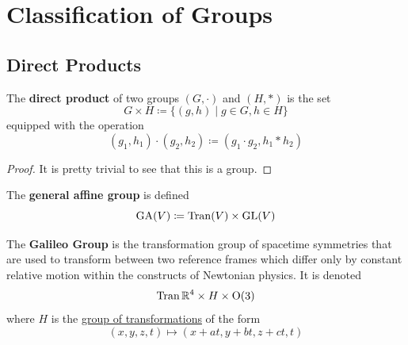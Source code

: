 \section{Classification of Groups} 

\subsection{Direct Products}

  \begin{definition}
    \label{def:direct-product}
    The \textbf{direct product} of two groups $(G, \cdot)$ and $(H, \ast)$ is the set 
    \begin{equation}
      G \times H \coloneqq \{ (g, h) \mid g \in G, h \in H \}
    \end{equation} 
    equipped with the operation 
    \begin{equation}
      (g_1, h_1) \cdot (g_2, h_2) \coloneqq (g_1 \cdot g_2, h_1 \ast h_2)
    \end{equation}
  \end{definition}
  \begin{proof}
    It is pretty trivial to see that this is a group. 
  \end{proof}

  \begin{example}
    \label{ex:general-affine-group}
    The \textbf{general affine group} is defined 
    \begin{equation}
      \operatorname{GA}(V) \coloneqq \operatorname{Tran}(V) \times \operatorname{GL}(V)
    \end{equation}
  \end{example}

  \begin{example}
    \label{ex:galileo-group}
    The \textbf{Galileo Group} is the transformation group of spacetime symmetries that are used to transform between two reference frames which differ only by constant relative motion within the constructs of Newtonian physics. It is denoted 
    \begin{equation}
      \operatorname{Tran} \mathbb{R}^{4} \times H \times \operatorname{O}(3)
    \end{equation}
    where $H$ is the \hyperref[def:group-of-transformations]{group of transformations} of the form 
    \begin{equation}
      (x, y, z, t) \mapsto (x+at, y+bt, z+ct, t)
    \end{equation}
  \end{example}

